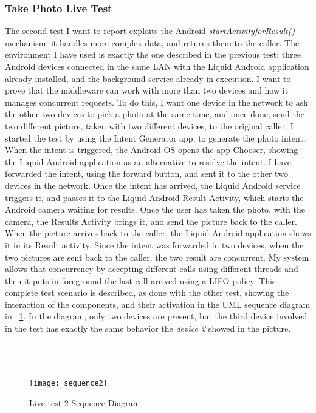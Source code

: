 \subsubsection{Take Photo Live Test}
The second test I want to report exploits the Android \textit{startActivityforResult()} mechanism: it handles more complex data, and returns them to the caller. The environment I have used is exactly the one described in the previous test: three Android devices connected in the same LAN with the Liquid Android application already installed, and the background service already in execution. I want to prove that the middleware can work with more than two devices and how it manages concurrent requests. To do this, I want one device in the network to ask the other two devices to pick a photo at the same time, and once done, send the two different picture, taken with two different devices, to the original caller. I started the test by using the Intent Generator app, to generate the photo intent. When the intent is triggered, the Android OS opens the app Chooser, showing the Liquid Android application as an alternative to resolve the intent. I have forwarded the intent, using the forward button, and sent it to the other two devices in the network. Once the intent has arrived, the Liquid Android service triggers it, and passes it to the Liquid Android Result Activity, which starts the Android camera waiting for results. Once the user has taken the photo, with the camera, the Results Activity brings it, and send the picture back to the caller. When the picture arrives back to the caller, the Liquid Android application shows it in its Result activity. Since the intent was forwarded in two devices, when the two pictures are sent back to the caller, the two result are concurrent. My system allows that concurrency by accepting different calls using different threads and then it puts in foreground the last call arrived using a LIFO policy. This complete test scenario is described, as done with the other test, showing the interaction of the components, and their activation in the UML sequence diagram in \figurename~\ref{fig:5.8}. In the diagram, only two devices are present, but the third device involved in the test has exactly the same behavior the \textit{device 2} showed in the picture.\\\\\\\\
\begin{figure}[h]
	\centering
	\texttt{[image: sequence2]}
	\caption{Live test 2 Sequence Diagram}
	\label{fig:5.8}
\end{figure}\\
